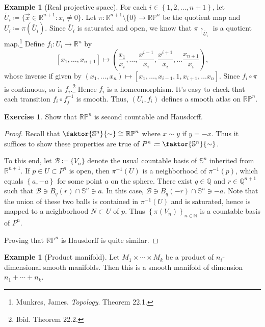 \documentclass[10pt,letterpaper,cm]{nupset}
\theoremstyle{definition}
\newtheorem{exmp}[definition]{Example}
\theoremstyle{theorem}
\newtheorem{exercise}[definition]{Exercise}
\theoremstyle{remark}
\newcommand{\N}{\mathbb N}
\newcommand{\Q}{\mathbb Q}
\newcommand{\R}{\mathbb R}
\newcommand{\RP}{\mathbb{RP}}
\renewcommand{\S}{\mathbb S}
\newcommand{\1}{\mathbf{1}}
\newcommand{\x}{\vec x}
\newcommand{\0}{\vec 0}
\begin{document}
\begin{exmp}[Real projective space]
 For each $i \in \left\{1, 2, \ldots, n+1\right\}$, let $\tilde{U_i}\coloneqq  \{\x \in \R^{n+1} : x_i \ne 0\}$. Let $\pi: \R^{n+1} \setminus\{0\} \to \RP^n$ be the quotient map and $U_i \coloneqq  \pi\left(\tilde{U_i}\right)$. Since $\tilde{U_i}$ is saturated and open, we know that $\pi \restriction_{\tilde{U_i}}$ is a quotient map.\footnote{Munkres, James. \textit{Topology}. Theorem 22.1.} Define $f_i : U_i \to \R^n$ by $$\left[x_1, \ldots, x_{n+1}\right] \mapsto \left(\frac{x_1}{x_i}, \ldots, \frac{x^{i-1}}{x_i}, \frac{x^{i+1}}{x_i}, \ldots \frac{x_{n+1}}{x_i}\right),$$ whose inverse if given by $\left(x_1, \ldots, x_n\right) \mapsto \left[x_1, \ldots, x_{i-1}, 1, x_{i+1}, \ldots x_n\right]$. Since $f_i \circ \pi$ is continuous, so is $f_i$.\footnote{Ibid. Theorem 22.2.} Hence $f_i$ is a homeomorphism. It's easy to check that each transition $f_i \circ f_j^{-1}$ is smooth. Thus, $\left(U_i, f_i\right)$ defines a smooth atlas on $\RP^n$.
\end{exmp}

\begin{exercise} 
Show that $\RP^n$ is second countable and Hausdorff. 
\end{exercise}
\begin{proof}
Recall that $\faktor{\S^n}{\sim} \cong \RP^n$ where $x \sim y$ if $y = {-x}$. Thus it suffices to show these properties are true of $P^n\coloneqq  \faktor{\S^n}{\sim}$. 

\smallskip


To this end, let $\mathcal{B}\coloneqq \{V_n\}$ denote the usual countable basis of $\S^n$ inherited from $\R^{n+1}$. If $p\in U\subset P^n$ is open, then $\pi^{-1}(U)$ is a neighborhood of $\pi^{-1}(p)$, which equals $\left\{a, {-a}\right\}$ for some point $a$ on the sphere.  There exist $q\in \Q$ and $r \in \Q^{n+1}$ such that $\mathcal{B} \ni B_q(r) \cap \S^n \ni a$. In this case, $\mathcal{B} \ni B_q({-r}) \cap \S^n \ni -a$. Note that the union of these two balls is contained in $\pi^{-1}(U)$ and is saturated, hence is mapped to a neighborhood $N \subset U$ of $p$. Thus $\left\{\pi(V_n)\right\}_{n\in \N}$  is a countable basis of $P^n$.

\smallskip

 Proving that $\RP^n$ is Hausdorff is quite similar.
\end{proof}

\begin{exmp}[Product manifold]

Let $M_1 \times \cdots \times M_k$ be a product of $n_i$-dimensional smooth manifolds. Then this is a smooth manifold of dimension $n_1 + \cdots + n_k$.

\end{exmp}
\end{document}
